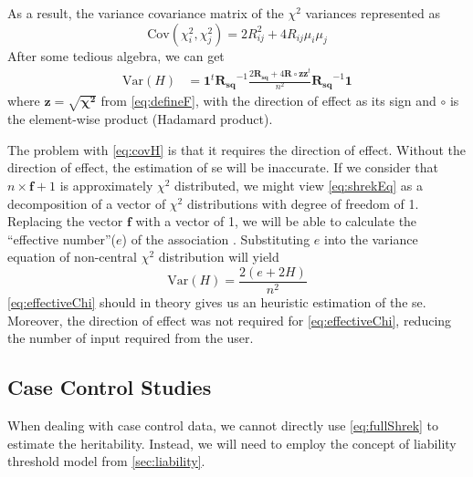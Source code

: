 			As a result, the variance covariance matrix of the $\chi^2$ variances represented as
			\begin{equation}
				\mathrm{Cov}(\chi_i^2,\chi_j^2) = 2R_{ij}^2+4R_{ij}\mu_i\mu_j
				\label{eq:finalChi}
			\end{equation}
			After some tedious algebra, we can get 
			\begin{align}
				\mathrm{Var}(H) &=\boldsymbol{1}^t\boldsymbol{R_{sq}}^{-1}\frac{2\boldsymbol{R_{sq}}+4\boldsymbol{R}\circ \boldsymbol{zz}^t}{n^2}\boldsymbol{R_{sq}}^{-1}\boldsymbol{1}
				\label{eq:covH}
			\end{align}
			where $\boldsymbol{z} = \sqrt{\boldsymbol{\chi^2}}$ from \cref{eq:defineF}, with the direction of effect as its sign and $\circ$ is the element-wise product (Hadamard product).
			 
			The problem with \cref{eq:covH} is that it requires the direction of effect. 
			Without the direction of effect, the estimation of \gls{se} will be inaccurate. 
			If we consider that $n\times \boldsymbol{f}+1$ is approximately $\chi^2$ distributed, we might view \cref{eq:shrekEq} as a decomposition of a vector of $\chi^2$ distributions with degree of freedom of 1. 
			Replacing the vector $\boldsymbol{f}$ with a vector of 1, we will be able to calculate the ``effective number''($e$) of the association \citep{Li2011}. 
			Substituting $e$ into the variance equation of non-central $\chi^2$ distribution will yield
			\begin{equation}
			\mathrm{Var}(H) = \frac{2(e+2H)}{n^2}
			\label{eq:effectiveChi}
			\end{equation}
			\cref{eq:effectiveChi} should in theory gives us an heuristic estimation of the \gls{se}. 
			Moreover, the direction of effect was not required for \cref{eq:effectiveChi}, reducing the number of input required from the user.
			
		\subsection{Case Control Studies}	 
			When dealing with case control data, we cannot directly use \cref{eq:fullShrek} to estimate the heritability.
			Instead, we will need to employ the concept of liability threshold model from \cref{sec:liability}. 
			
